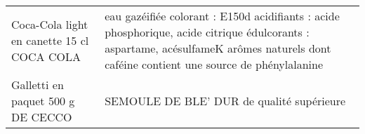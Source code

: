\begin{longtable}{p{5cm}p{10cm}}
                                                               Coca-Cola light en canette 15 cl COCA COLA &                                                                                                                                                                                                                                                                                                                                                                                                                                                                                                                                                                                                                                                                                                                                                                                                                                              eau gazéifiée  colorant : E150d  acidifiants : acide phosphorique, acide citrique  édulcorants : aspartame, acésulfameK  arômes naturels dont caféine  contient une source de phénylalanine \\
                                                                        Galletti en paquet 500 g DE CECCO &                                                                                                                                                                                                                                                                                                                                                                                                                                                                                                                                                                                                                                                                                                                                                                                                                                                                                                                                                                                                SEMOULE DE BLE' DUR de qualité supérieure \\

\end{longtable}
